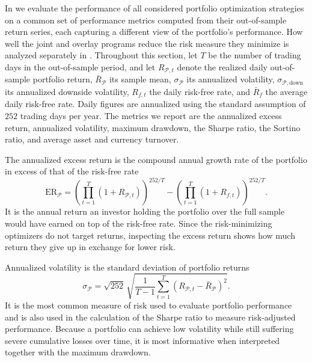 In  we evaluate the performance of all considered portfolio optimization strategies on a common set of performance metrics computed from
their out-of-sample return series, each capturing a different view of the portfolio's performance. How well the
joint and overlay programs reduce the risk measure they minimize is analyzed separately in
. Throughout this section, let $T$ be the number of trading days in the out-of-sample period, and let $R_{\mathcal P,t}$ denote
the realized daily out-of-sample portfolio return, $\bar R_{\mathcal P}$ its
sample mean, $\sigma_{\mathcal P}$ its annualized volatility, $\sigma_{\mathcal{P}, \text{down}}$ its annualized downside volatility, $R_{f, t}$ the
daily risk-free
rate, and $\bar R_f$ the
average daily risk-free rate. Daily figures are annualized using the standard assumption of $252$ trading days per year. The metrics we report are
the annualized excess return, annualized volatility, maximum drawdown, the Sharpe ratio, the Sortino ratio, and average asset
and currency turnover.

The annualized excess return is the compound annual growth rate of the portfolio in
excess of that of the risk-free rate
\begin{equation*}
  \mathrm{ER_{\mathcal P}}
  = \left( \prod_{t=1}^{T} \left(1 + R_{\mathcal P,t}\right) \right)^{252/T}
  - \left( \prod_{t=1}^{T} \left(1 + R_{f,t}\right) \right)^{252/T}.
\end{equation*}
It is the annual return an investor holding the portfolio over the full sample would
have earned on top of the risk-free rate. 
Since the risk-minimizing optimizers do not target returns, inspecting the excess return shows
how much return they give up in exchange for lower risk.

Annualized volatility is the standard deviation of portfolio returns
\begin{equation*}
  \sigma_{\mathcal P} = \sqrt{252} \, \sqrt{\frac{1}{T-1} \sum_{t=1}^{T}
  \left(R_{\mathcal P,t} - \bar R_{\mathcal P}\right)^2}.
\end{equation*}
It is the most common measure of risk used to evaluate portfolio performance and is also used in the
calculation of the Sharpe ratio to measure risk-adjusted performance.
Because a portfolio can achieve low volatility while still suffering severe cumulative
losses over time, it is most informative when interpreted together with the maximum
drawdown.


